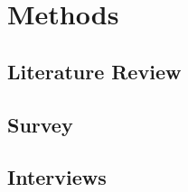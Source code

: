 \section{Methods}
\label{sec:methods}

\blindtext


\subsection{Literature Review}
\label{subsec:lit_review}

\blindtext


\subsection{Survey}
\label{subsec:survey}

\blindtext


\subsection{Interviews}
\label{subsec:interviews}

\blindtext